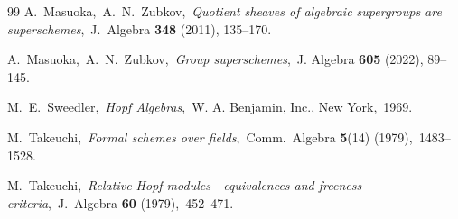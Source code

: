 \documentclass[11pt, a4paper]{amsart}
\theoremstyle{definition}
\numberwithin{equation}{section}
\begin{document}
\begin{thebibliography}{99}
 A.~Masuoka,\ A.~N.~Zubkov,\ 
\emph{Quotient sheaves of algebraic supergroups are superschemes},\ 
J.\ Algebra \textbf{348} (2011), 135--170.

 A.~Masuoka,\ A.~N.~Zubkov,\ 
\emph{Group superschemes},\  
J. Algebra \textbf{605} (2022),  89--145.

\bibitem{Sw} 
M.~E.~Sweedler,\ 
\emph{Hopf Algebras},\
W. A. Benjamin, Inc., New York,\ 1969.

 M.~Takeuchi,\ 
\emph{Formal schemes over fields},\ 
Comm.\ Algebra \textbf{5}(14) (1979),\ 1483--1528.


\bibitem{T} M.~Takeuchi,\ 
\emph{Relative Hopf modules—equivalences and freeness criteria},\ 
J.\ Algebra \textbf{60} (1979),\ 452–471.






\end{thebibliography}
\end{document}
